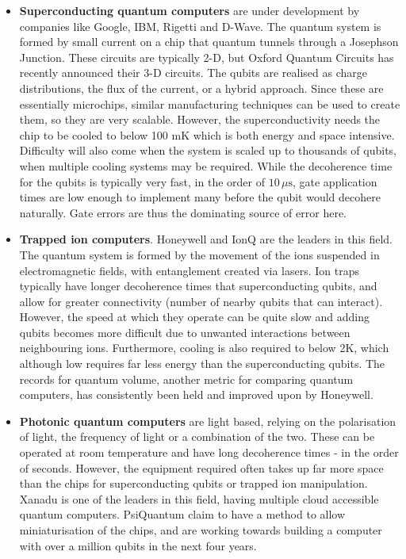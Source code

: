 \documentclass{article}
\theoremstyle{definition}
\begin{document}
\begin{itemize}
    \item \textbf{Superconducting quantum computers} are under development by companies like Google, IBM, Rigetti and D-Wave. The quantum system is formed by small current on a chip that quantum tunnels through a Josephson Junction. These circuits are typically 2-D, but Oxford Quantum Circuits has recently announced their 3-D circuits. The qubits are realised as charge distributions, the flux of the current, or a hybrid approach. Since these are essentially microchips, similar manufacturing techniques can be used to create them, so they are very scalable. However, the superconductivity needs the chip to be cooled to below 100 mK which is both energy and space intensive. Difficulty will also come when the system is scaled up to thousands of qubits, when multiple cooling systems may be required. While the decoherence time for the qubits is typically very fast, in the order of $10 \, \mu \text{s}$, gate application times are low enough to implement many before the qubit would decohere naturally. Gate errors are thus the dominating source of error here.
    \item \textbf{Trapped ion computers}. Honeywell and IonQ are the leaders in this field. The quantum system is formed by the movement of the ions suspended in electromagnetic fields, with entanglement created via lasers. Ion traps typically have longer decoherence times that superconducting qubits, and allow for greater connectivity (number of nearby qubits that can interact). However, the speed at which they operate can be quite slow and adding qubits becomes more difficult due to unwanted interactions between neighbouring ions. Furthermore, cooling is also required to below 2K, which although low requires far less energy than the superconducting qubits. The records for quantum volume, another metric for comparing quantum computers, has consistently been held and improved upon by Honeywell.
    \item \textbf{Photonic quantum computers} are light based, relying on the polarisation of light, the frequency of light or a combination of the two. These can be operated at room temperature and have long decoherence times - in the order of seconds. However, the equipment required often takes up far more space than the chips for superconducting qubits or trapped ion manipulation. Xanadu is one of the leaders in this field, having multiple cloud accessible quantum computers. PsiQuantum claim to have a method to allow miniaturisation of the chips, and are working towards building a computer with over a million qubits in the next four years. 

\end{itemize}
\end{document}
